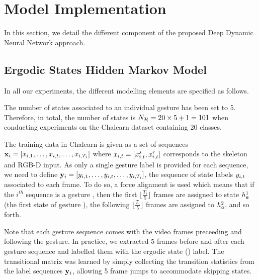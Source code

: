 

\section{Model Implementation}
\label{sec:ModelImplementation}

In this section, we detail the different component of the proposed Deep Dynamic Neural Network approach.

\subsection{Ergodic States Hidden Markov Model}

In all our experiments, the different modelling elements are specified as follows.
 
The number of states \nsig{} associated to an individual gesture has been set to 5. 
Therefore, in total, the number of states is $N_{\mathcal{H}} = 20 \times 5 + 1 = 101$ 
when conducting  experiments on the Chalearn dataset containing 20 classes.

The training data in Chalearn is given as a set of sequences 
$\mathbf x_i=[x_{i,1}, \ldots,x_{i,t},\ldots, x_{i,T_i}]$ 
where $x_{i,t}=[x_{i,t}^s, x_{i,t}^r]$ corresponds to the skeleton and RGB-D input.
%
As only a single gesture label is provided for each sequence, we need to define 
$\mathbf y_i=[y_{i,1}, \ldots,y_{i,t},\ldots, y_{i,T_i}]$, 
the sequence of state labels $y_{i,t}$ associated to each frame. 
%
To do so, a force alignment is used which means that if the $i^{th}$ sequence is a gesture \gesturea{}, then the first $\lfloor \frac{T_i}{5} \rfloor$ frames are assigned to state $h_{\textbf{\emph{a}}}^1$ (the first state of gesture \gesturea{}), 
the following $\lfloor \frac{T_i}{5} \rfloor$ frames are assigned to $h_{\textbf{\emph{a}}}^2$, and so forth.

Note that each gesture sequence comes with the video frames preceeding and following the gesture. 
In practice, we extracted 5 frames before and after each gesture sequence and labelled them 
with the ergodic state (\ergodicstate) label.
%
The transitional matrix \transitionmatrix{} was learned by simply  collecting the transition statistics from the label sequences $\mathbf y_i$, allowing 5 frame jumps to accommodate skipping states.

%
%


